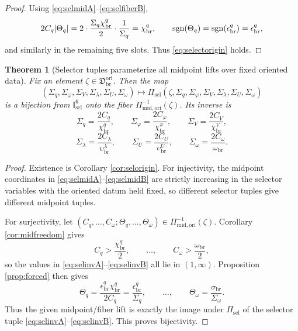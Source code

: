 \documentclass[11pt]{article}
\newcommand{\OriginSector}{\mathfrak D_{\mathrm{br}}^{\mathrm{ori}}}
\newcommand{\AbsReadAmp}{\chi_{\mathrm{br}}^{q}}
\newcommand{\AbsCovAmp}{\chi_{\mathrm{br}}^{\varphi}}
\newcommand{\AbsRelaxAmp}{\chi_{\mathrm{br}}^{V}}
\newcommand{\AbsWellAmp}{\upsilon_{\mathrm{br}}^{\lambda}}
\newcommand{\AbsEqAmp}{\upsilon_{\mathrm{br}}^{U}}
\newcommand{\AbsScaleAmp}{\omega_{\mathrm{br}}}
\newcommand{\PolRead}{\epsilon_{\mathrm{br}}^{q}}
\newcommand{\PolScale}{\sigma_{\mathrm{br}}}
\newcommand{\MidOriginMap}{\Pi_{\mathrm{mid,ori}}}
\newcommand{\MidRead}{C_{q}}
\newcommand{\MidCov}{C_{\varphi}}
\newcommand{\MidRelax}{C_{V}}
\newcommand{\MidWell}{C_{\lambda}}
\newcommand{\MidEq}{C_{U}}
\newcommand{\MidScale}{C_{\omega}}
\newcommand{\FiberRead}{\Theta_{q}}
\newcommand{\FiberScale}{\Theta_{\omega}}
\newcommand{\MidSelMap}{\Pi_{\mathrm{sel}}}
\newcommand{\SelDom}{\mathbb I_{\mathrm{sel}}}
\newcommand{\SelRead}{\Sigma_{q}}
\newcommand{\SelCov}{\Sigma_{\varphi}}
\newcommand{\SelRelax}{\Sigma_{V}}
\newcommand{\SelWell}{\Sigma_{\lambda}}
\newcommand{\SelEq}{\Sigma_{U}}
\newcommand{\SelScale}{\Sigma_{\omega}}
\newtheorem{theorem}{Theorem}
\begin{document}
\begin{proof}
Using \eqref{eq:selmidA}--\eqref{eq:selfiberB},
\[
2\MidRead\abs{\FiberRead}
=
2\cdot\frac{\SelRead\AbsReadAmp}{2}\cdot\frac{1}{\SelRead}
=
\AbsReadAmp,
\qquad
\operatorname{sgn}(\FiberRead)=\operatorname{sgn}(\PolRead)=\PolRead,
\]
and similarly in the remaining five slots. Thus \eqref{eq:selectorigin} holds.
\end{proof}

\begin{theorem}[Selector tuples parameterize all midpoint lifts over fixed oriented data]
\label{thm:selbijection}
Fix an element \(\zeta\in\OriginSector\). Then the map
\[
(\SelRead,\SelCov,\SelRelax,\SelWell,\SelEq,\SelScale)
\longmapsto
\MidSelMap(\zeta,\SelRead,\SelCov,\SelRelax,\SelWell,\SelEq,\SelScale)
\]
is a bijection from \(\SelDom^{6}\) onto the fiber \(\MidOriginMap^{-1}(\zeta)\). Its inverse is
\begin{equation}
\SelRead=\frac{2\MidRead}{\AbsReadAmp},
\qquad
\SelCov=\frac{2\MidCov}{\AbsCovAmp},
\qquad
\SelRelax=\frac{2\MidRelax}{\AbsRelaxAmp},
\label{eq:selinvA}
\end{equation}
\begin{equation}
\SelWell=\frac{2\MidWell}{\AbsWellAmp},
\qquad
\SelEq=\frac{2\MidEq}{\AbsEqAmp},
\qquad
\SelScale=\frac{2\MidScale}{\AbsScaleAmp}.
\label{eq:selinvB}
\end{equation}
\end{theorem}

\begin{proof}
Existence is Corollary \ref{cor:selorigin}. For injectivity, the midpoint coordinates in \eqref{eq:selmidA}--\eqref{eq:selmidB} are strictly increasing in the selector variables with the oriented datum held fixed, so different selector tuples give different midpoint tuples.

For surjectivity, let \((\MidRead,\ldots,\MidScale;\FiberRead,\ldots,\FiberScale)\in\MidOriginMap^{-1}(\zeta)\). Corollary \ref{cor:midfreedom} gives
\[
\MidRead>\frac{\AbsReadAmp}{2},
\qquad
\ldots,
\qquad
\MidScale>\frac{\AbsScaleAmp}{2},
\]
so the values in \eqref{eq:selinvA}--\eqref{eq:selinvB} all lie in \((1,\infty)\). Proposition \ref{prop:forced} then gives
\[
\FiberRead
=
\frac{\PolRead\AbsReadAmp}{2\MidRead}
=
\frac{\PolRead}{\SelRead},
\qquad
\ldots,
\qquad
\FiberScale
=
\frac{\PolScale}{\SelScale}.
\]
Thus the given midpoint/fiber lift is exactly the image under \(\MidSelMap\) of the selector tuple \eqref{eq:selinvA}--\eqref{eq:selinvB}. This proves bijectivity.
\end{proof}
\end{document}

